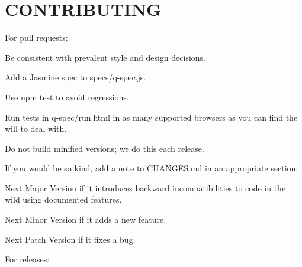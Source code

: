\chapter{CONTRIBUTING}
\hypertarget{md__c_1_2_users_2_s_t_r_i_d_e_r_2source_2repos_2_internal_a_p_i_2_internal_a_p_i_2wwwroot_2lib_29c3be333db3be714273fe8be968875cf}{}\label{md__c_1_2_users_2_s_t_r_i_d_e_r_2source_2repos_2_internal_a_p_i_2_internal_a_p_i_2wwwroot_2lib_29c3be333db3be714273fe8be968875cf}
For pull requests\+:


\begin{DoxyItemize}
\item Be consistent with prevalent style and design decisions.
\item Add a Jasmine spec to {\ttfamily specs/q-\/spec.\+js}.
\item Use {\ttfamily npm test} to avoid regressions.
\item Run tests in {\ttfamily q-\/spec/run.\+html} in as many supported browsers as you can find the will to deal with.
\item Do not build minified versions; we do this each release.
\item If you would be so kind, add a note to {\ttfamily CHANGES.\+md} in an appropriate section\+:
\begin{DoxyItemize}
\item {\ttfamily Next Major Version} if it introduces backward incompatibilities to code in the wild using documented features.
\item {\ttfamily Next Minor Version} if it adds a new feature.
\item {\ttfamily Next Patch Version} if it fixes a bug.
\end{DoxyItemize}
\end{DoxyItemize}

For releases\+:


